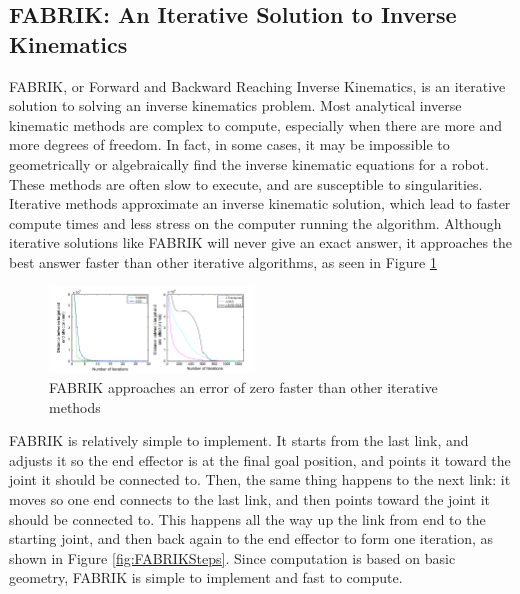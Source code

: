 \subsection{FABRIK: An Iterative Solution to Inverse Kinematics}
FABRIK, or Forward and Backward Reaching Inverse Kinematics, is an iterative solution to solving an inverse kinematics problem. Most analytical inverse kinematic methods are complex to compute, especially when there are more and more degrees of freedom. In fact, in some cases, it may be impossible to geometrically or algebraically find the inverse kinematic equations for a robot. These methods are often slow to execute, and are susceptible to singularities. Iterative methods approximate an inverse kinematic solution, which lead to faster compute times and less stress on the computer running the algorithm. Although iterative solutions like FABRIK will never give an exact answer, it approaches the best answer faster than other iterative algorithms, as seen in Figure \ref{fig:IterativeComparisons}
\begin{figure}[thbp]
    \centering
    \includegraphics[width=0.485\textwidth]{Figures/FABRIKComparisons}
    \caption{FABRIK approaches an error of zero faster than other iterative methods \cite{fabrik2011}}
    \label{fig:IterativeComparisons}
\end{figure}

FABRIK is relatively simple to implement. It starts from the last link, and adjusts it so the end effector is at the final goal position, and points it toward the joint it should be connected to. Then, the same thing happens to the next link: it moves so one end connects to the last link, and then points toward the joint it should be connected to. This happens all the way up the link from end to the starting joint, and then back again to the end effector to form one iteration, as shown in Figure \ref{fig:FABRIKSteps}. Since computation is based on basic geometry, FABRIK is simple to implement and fast to compute.

